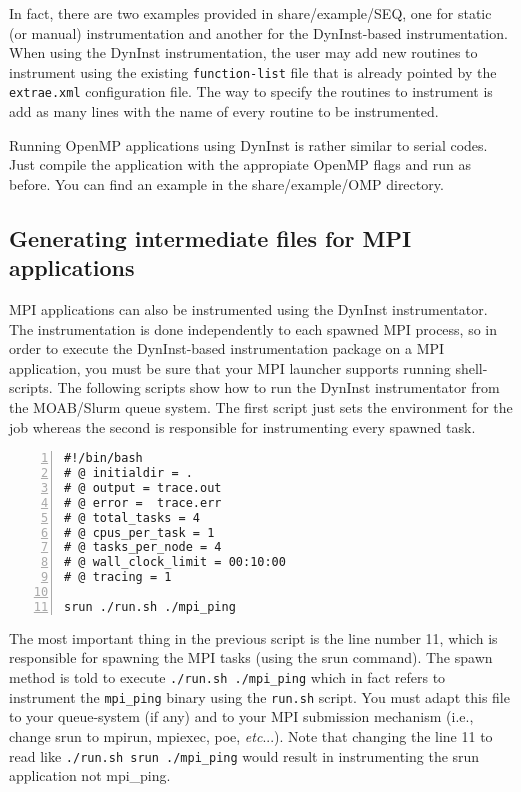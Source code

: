 In fact, there are two examples provided in share/example/SEQ, one for static (or manual) instrumentation and another for the DynInst-based instrumentation. When using the DynInst instrumentation, the user may add new routines to instrument using the existing {\tt function-list} file that is already pointed by the {\tt extrae.xml} configuration file. The way to specify the routines to instrument is add as many lines with the name of every routine to be instrumented.

Running OpenMP applications using DynInst is rather similar to serial codes. Just compile the application with the appropiate OpenMP flags and run as before. You can find an example in the share/example/OMP directory.

\subsection{Generating intermediate files for MPI applications}\label{subsec:Examples_DynInst_Intermediate_MPI}

MPI applications can also be instrumented using the DynInst instrumentator. The instrumentation is done independently to each spawned MPI process, so in order to execute the DynInst-based instrumentation package on a MPI application, you must be sure that your MPI launcher supports running shell-scripts. The following scripts show how to run the DynInst instrumentator from the MOAB/Slurm queue system. The first script just sets the environment for the job whereas the second is responsible for instrumenting every spawned task.

\begin{Verbatim}[frame=single,numbers=left,labelposition=topline,label=slurm\_trace.sh]
#!/bin/bash
# @ initialdir = .
# @ output = trace.out
# @ error =  trace.err
# @ total_tasks = 4
# @ cpus_per_task = 1
# @ tasks_per_node = 4
# @ wall_clock_limit = 00:10:00
# @ tracing = 1

srun ./run.sh ./mpi_ping
\end{Verbatim}

The most important thing in the previous script is the line number 11, which is responsible for spawning the MPI tasks (using the srun command). The spawn method is told to execute {\tt ./run.sh ./mpi\_ping} which in fact refers to instrument the {\tt mpi\_ping} binary using the {\tt run.sh} script. You must adapt this file to your queue-system (if any) and to your MPI submission mechanism (i.e., change srun to mpirun, mpiexec, poe, {\it etc}...).  Note that changing the line 11 to read like {\tt ./run.sh srun ./mpi\_ping} would result in instrumenting the srun application not mpi\_ping.

